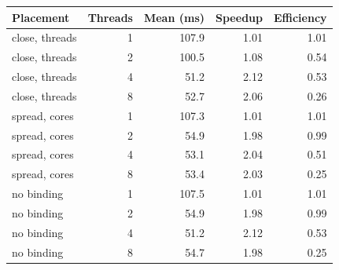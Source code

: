 \begin{tabular}{lrrrr}
\toprule
Placement & Threads & Mean (ms) & Speedup & Efficiency \\
\midrule
close, threads & 1 & 107.9 & 1.01 & 1.01 \\
close, threads & 2 & 100.5 & 1.08 & 0.54 \\
close, threads & 4 & 51.2 & 2.12 & 0.53 \\
close, threads & 8 & 52.7 & 2.06 & 0.26 \\
spread, cores & 1 & 107.3 & 1.01 & 1.01 \\
spread, cores & 2 & 54.9 & 1.98 & 0.99 \\
spread, cores & 4 & 53.1 & 2.04 & 0.51 \\
spread, cores & 8 & 53.4 & 2.03 & 0.25 \\
no binding & 1 & 107.5 & 1.01 & 1.01 \\
no binding & 2 & 54.9 & 1.98 & 0.99 \\
no binding & 4 & 51.2 & 2.12 & 0.53 \\
no binding & 8 & 54.7 & 1.98 & 0.25 \\
\bottomrule
\end{tabular}
